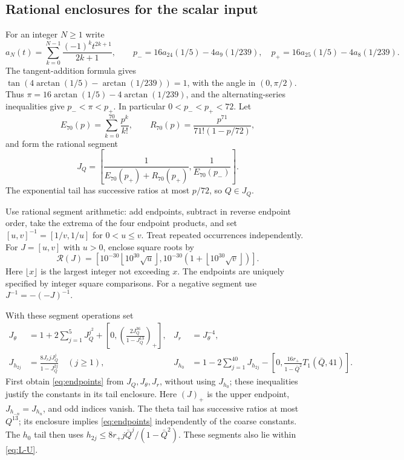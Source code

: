 \documentclass[a4paper,11pt]{article}
\numberwithin{equation}{section}
\theoremstyle{definition}
\theoremstyle{remark}
\begin{document}
\subsection{Rational enclosures for the scalar input}
For an integer $N\ge1$ write
\[
 a_N(t)=\sum_{k=0}^{N-1}\frac{(-1)^kt^{2k+1}}{2k+1},\qquad
 p_-=16a_{24}(1/5)-4a_9(1/239),\quad
 p_+=16a_{25}(1/5)-4a_8(1/239).
\]
The tangent-addition formula gives $\tan(4\arctan(1/5)-\arctan(1/239))=1$, with the angle in $(0,\pi/2)$. Thus $\pi=16\arctan(1/5)-4\arctan(1/239)$, and the alternating-series inequalities give $p_-<\pi<p_+$. In particular $0<p_-<p_+<72$. Let
\[
 E_{70}(p)=\sum_{k=0}^{70}\frac{p^k}{k!},\qquad
 R_{70}(p)=\frac{p^{71}}{71!(1-p/72)},
\]
and form the rational segment
\begin{equation}\label{eq:fine-Q}
 J_Q=\left[\frac1{E_{70}(p_+)+R_{70}(p_+)},\frac1{E_{70}(p_-)}\right].
\end{equation}
The exponential tail has successive ratios at most $p/72$, so $Q\in J_Q$.

Use rational segment arithmetic: add endpoints, subtract in reverse endpoint order, take the extrema of the four endpoint products, and set $[u,v]^{-1}=[1/v,1/u]$ for $0<u\le v$. Treat repeated occurrences independently. For $J=[u,v]$ with $u>0$, enclose square roots by
\begin{equation}\label{eq:sqrt-envelope}
 \mathcal R(J)=\left[
 10^{-30}\left\lfloor10^{30}\sqrt u\right\rfloor,
 10^{-30}\left(1+\left\lfloor10^{30}\sqrt v\right\rfloor\right)\right].
\end{equation}
Here $\lfloor x\rfloor$ is the largest integer not exceeding $x$. The endpoints are uniquely specified by integer square comparisons. For a negative segment use $J^{-1}=-(-J)^{-1}$.

With these segment operations set
\begin{equation}\label{eq:fine-input}
\begin{aligned}
 J_\theta&=1+2\sum_{j=1}^{5}J_Q^{j^2}
 +\left[0,\left(\frac{2J_Q^{36}}{1-J_Q^{13}}\right)_+\right],
 &J_r&=J_\theta^{-4},\\
 J_{h_{2j}}&=\frac{8J_rjJ_Q^j}{1-J_Q^{2j}}\quad(j\ge1),
 &J_{h_0}&=1-2\sum_{j=1}^{40}J_{h_{2j}}
 -\left[0,\frac{16r_+}{1-\bar Q^2}T_1(\bar Q,41)\right].
\end{aligned}
\end{equation}
First obtain \eqref{eq:endpoints} from $J_Q,J_\theta,J_r$, without using $J_{h_0}$; these inequalities justify the constants in its tail enclosure. Here $(J)_+$ is the upper endpoint, $J_{h_{-n}}=J_{h_n}$, and odd indices vanish. The theta tail has successive ratios at most $Q^{13}$; its enclosure implies \eqref{eq:endpoints} independently of the coarse constants. The $h_0$ tail then uses $h_{2j}\le8r_+j\bar Q^j/(1-\bar Q^2)$. These segments also lie within \eqref{eq:L-U}.
\end{document}
